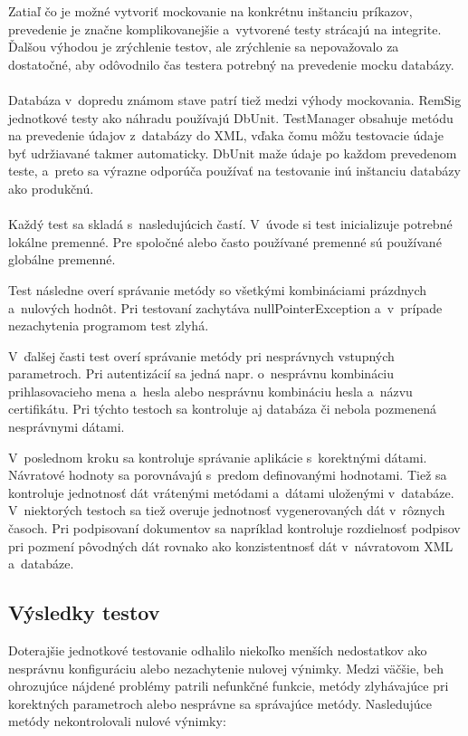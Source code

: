 \documentclass[
  printed, %
  table,   %
oneside,
  nolof,     %
  nolot,     %
]{fithesis3}
\begin{document}
Zatiaľ čo je možné vytvoriť mockovanie na konkrétnu inštanciu príkazov, prevedenie je značne komplikovanejšie a~vytvorené testy strácajú na integrite. Ďalšou výhodou je zrýchlenie testov, ale zrýchlenie sa nepovažovalo za dostatočné, aby odôvodnilo čas testera potrebný na prevedenie mocku databázy. \paragraph{}
Databáza v~dopredu známom stave patrí tiež medzi výhody mockovania. RemSig jednotkové testy ako náhradu  používajú DbUnit. TestManager obsahuje metódu na   prevedenie údajov z~databázy do XML, vďaka čomu môžu testovacie údaje byť udržiavané takmer automaticky. DbUnit maže údaje po každom prevedenom teste, a~preto sa výrazne odporúča používať na testovanie inú inštanciu databázy ako produkčnú. \paragraph{}

Každý test sa skladá s~nasledujúcich častí. V~úvode si test inicializuje potrebné lokálne premenné. Pre spoločné alebo často používané premenné sú používané globálne premenné. 

Test následne overí správanie metódy so všetkými kombináciami prázdnych a~nulových hodnôt. Pri testovaní zachytáva nullPointerException a~v~prípade nezachytenia programom test zlyhá.

V~ďalšej časti test overí správanie metódy pri nesprávnych vstupných parametroch.
 Pri autentizácií sa jedná napr. o~nesprávnu kombináciu prihlasovacieho mena a~hesla alebo nesprávnu kombináciu hesla a~názvu certifikátu. Pri týchto testoch sa kontroluje aj databáza či nebola pozmenená nesprávnymi dátami.
 
V~poslednom kroku sa kontroluje správanie aplikácie s~korektnými dátami. Návratové hodnoty sa porovnávajú s~predom definovanými hodnotami.
Tiež sa kontroluje jednotnosť dát vrátenými metódami a~dátami uloženými v~databáze. V~niektorých testoch sa tiež overuje jednotnosť vygenerovaných dát v~rôznych časoch. Pri podpisovaní dokumentov sa napríklad kontroluje rozdielnosť podpisov pri pozmení pôvodných dát rovnako ako konzistentnosť dát v~návratovom XML a~databáze.   

\subsection{Výsledky testov}
Doterajšie jednotkové testovanie odhalilo niekoľko menších nedostatkov ako nesprávnu konfiguráciu alebo nezachytenie nulovej výnimky. Medzi väčšie, beh ohrozujúce nájdené problémy patrili nefunkčné funkcie, metódy zlyhávajúce pri korektných parametroch alebo nesprávne sa správajúce metódy.  
Nasledujúce metódy nekontrolovali nulové výnimky: 
\end{document}
